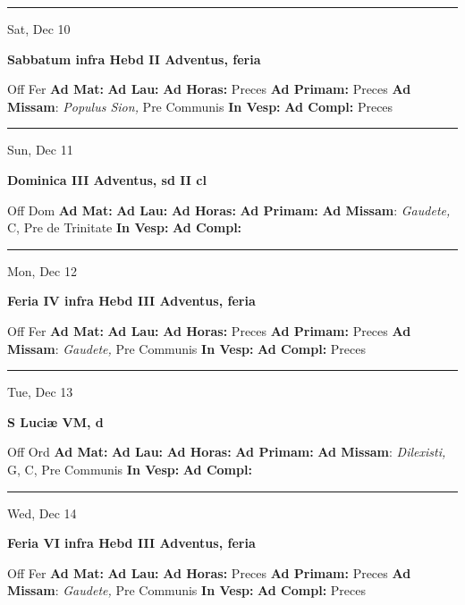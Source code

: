 \documentclass[letterpaper, 10pt]{article}
\begin{document}
\hrule
\begin{center}
Sat, Dec 10
\end{center}\textbf{ \large Sabbatum infra Hebd II Adventus, \textnormal{\normalsize feria}}
\begin{justify}
Off Fer
\textbf{Ad Mat: }
\textbf{Ad Lau: }
\textbf{Ad Horas: }Preces
\textbf{Ad Primam: }Preces
\textbf{Ad Missam}: \textit{Populus Sion,} Pre Communis
\textbf{In Vesp: }
\textbf{Ad Compl: }Preces\end{justify}



\hrule
\begin{center}
Sun, Dec 11
\end{center}\textbf{ \large Dominica III Adventus, \textnormal{\normalsize sd II cl}}
\begin{justify}
Off Dom
\textbf{Ad Mat: }
\textbf{Ad Lau: }
\textbf{Ad Horas: }
\textbf{Ad Primam: }
\textbf{Ad Missam}: \textit{Gaudete,} C, Pre de Trinitate
\textbf{In Vesp: }
\textbf{Ad Compl: }\end{justify}



\hrule
\begin{center}
Mon, Dec 12
\end{center}\textbf{ \large Feria IV infra Hebd III Adventus, \textnormal{\normalsize feria}}
\begin{justify}
Off Fer
\textbf{Ad Mat: }
\textbf{Ad Lau: }
\textbf{Ad Horas: }Preces
\textbf{Ad Primam: }Preces
\textbf{Ad Missam}: \textit{Gaudete,} Pre Communis
\textbf{In Vesp: }
\textbf{Ad Compl: }Preces\end{justify}



\hrule
\begin{center}
Tue, Dec 13
\end{center}\textbf{ \large S Luciæ VM, \textnormal{\normalsize d}}
\begin{justify}
Off Ord
\textbf{Ad Mat: }
\textbf{Ad Lau: }
\textbf{Ad Horas: }
\textbf{Ad Primam: }
\textbf{Ad Missam}: \textit{Dilexisti,} G, C, Pre Communis
\textbf{In Vesp: }
\textbf{Ad Compl: }\end{justify}



\hrule
\begin{center}
Wed, Dec 14
\end{center}\textbf{ \large Feria VI infra Hebd III Adventus, \textnormal{\normalsize feria}}
\begin{justify}
Off Fer
\textbf{Ad Mat: }
\textbf{Ad Lau: }
\textbf{Ad Horas: }Preces
\textbf{Ad Primam: }Preces
\textbf{Ad Missam}: \textit{Gaudete,} Pre Communis
\textbf{In Vesp: }
\textbf{Ad Compl: }Preces\end{justify}
\end{document}
